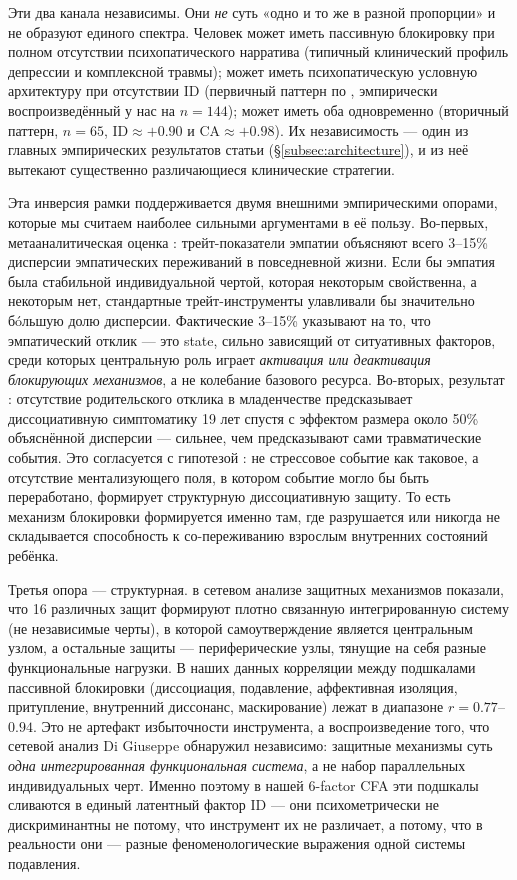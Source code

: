 Эти два канала независимы. Они \emph{не} суть «одно и то же в разной пропорции» и не образуют единого спектра. Человек может иметь пассивную блокировку при полном отсутствии психопатического нарратива (типичный клинический профиль депрессии и комплексной травмы); может иметь психопатическую условную архитектуру при отсутствии ID (первичный паттерн по \citet{karpman1941}, эмпирически воспроизведённый у нас на $n=144$); может иметь оба одновременно (вторичный паттерн, $n=65$, $\mathrm{ID} \approx +0.90$ и $\mathrm{CA} \approx +0.98$). Их независимость --- один из главных эмпирических результатов статьи (§\ref{subsec:architecture}), и из неё вытекают существенно различающиеся клинические стратегии.

Эта инверсия рамки поддерживается двумя внешними эмпирическими опорами, которые мы считаем наиболее сильными аргументами в её пользу. Во-первых, метааналитическая оценка \citet{depow2025}: трейт-показатели эмпатии объясняют всего 3--15\% дисперсии эмпатических переживаний в повседневной жизни. Если бы эмпатия была стабильной индивидуальной чертой, которая некоторым свойственна, а некоторым нет, стандартные трейт-инструменты улавливали бы значительно бóльшую долю дисперсии. Фактические 3--15\% указывают на то, что эмпатический отклик --- это state, сильно зависящий от ситуативных факторов, среди которых центральную роль играет \emph{активация или деактивация блокирующих механизмов}, а не колебание базового ресурса. Во-вторых, результат \citet{ogawa1997}: отсутствие родительского отклика в младенчестве предсказывает диссоциативную симптоматику 19 лет спустя с эффектом размера около 50\% объяснённой дисперсии --- сильнее, чем предсказывают сами травматические события. Это согласуется с гипотезой \citet{fonagy2002}: не стрессовое событие как таковое, а отсутствие ментализующего поля, в котором событие могло бы быть переработано, формирует структурную диссоциативную защиту. То есть механизм блокировки формируется именно там, где разрушается или никогда не складывается способность к со-переживанию взрослым внутренних состояний ребёнка.

Третья опора --- структурная. \citet{digiuseppe2024} в сетевом анализе защитных механизмов показали, что 16 различных защит формируют плотно связанную интегрированную систему (не независимые черты), в которой самоутверждение является центральным узлом, а остальные защиты --- периферические узлы, тянущие на себя разные функциональные нагрузки. В наших данных корреляции между подшкалами пассивной блокировки (диссоциация, подавление, аффективная изоляция, притупление, внутренний диссонанс, маскирование) лежат в диапазоне $r = 0.77$--$0.94$. Это не артефакт избыточности инструмента, а воспроизведение того, что сетевой анализ Di Giuseppe обнаружил независимо: защитные механизмы суть \emph{одна интегрированная функциональная система}, а не набор параллельных индивидуальных черт. Именно поэтому в нашей 6-factor CFA эти подшкалы сливаются в единый латентный фактор ID --- они психометрически не дискриминантны не потому, что инструмент их не различает, а потому, что в реальности они --- разные феноменологические выражения одной системы подавления.

